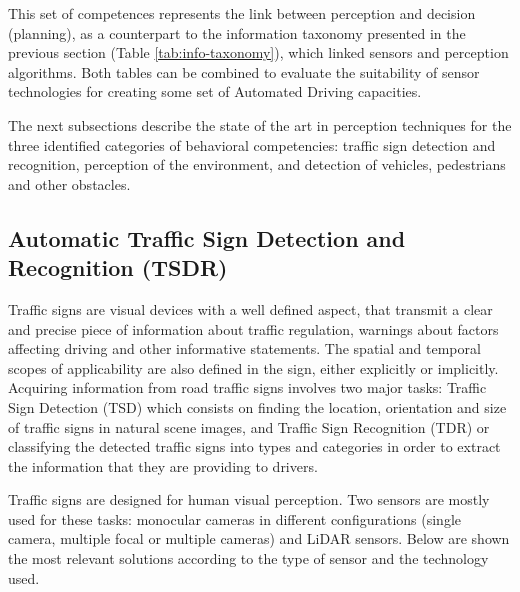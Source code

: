 This set of competences represents the link between perception and decision
(planning), as a counterpart to the information taxonomy presented in the
previous section (Table \ref{tab:info-taxonomy}), which linked sensors and 
perception algorithms. 
Both tables can be combined to evaluate the suitability of sensor technologies
for creating some set of Automated Driving capacities.

The next subsections describe the state of the art in perception techniques for
the three identified categories of behavioral competencies: traffic sign 
detection and recognition, perception of the environment, and detection of 
vehicles, pedestrians and other obstacles.

\subsection{Automatic Traffic Sign Detection and Recognition (TSDR)} 
Traffic signs are visual devices with a well defined aspect, that transmit a 
clear and precise piece of information about traffic regulation, warnings about
factors affecting driving and other informative statements. The spatial and
temporal scopes of applicability are also defined in the sign, either 
explicitly or implicitly.
Acquiring information from road traffic signs involves two major tasks: 
Traffic Sign Detection (TSD) which consists on finding the location, 
orientation and size of traffic signs in natural scene images, and Traffic Sign 
Recognition (TDR) or classifying the detected traffic signs into types 
and categories in order to extract the information that they are providing to 
drivers.

Traffic signs are designed for human visual perception. Two sensors are mostly
used for these tasks: monocular cameras in different configurations 
(single camera, multiple focal or multiple cameras) and LiDAR sensors.
Below are shown the most relevant solutions according to the type of sensor 
and the technology used.

